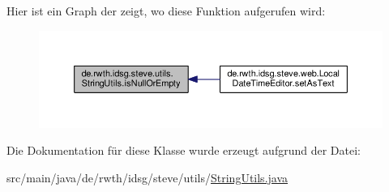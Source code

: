 Hier ist ein Graph der zeigt, wo diese Funktion aufgerufen wird\-:
\nopagebreak
\begin{figure}[H]
\begin{center}
\leavevmode
\includegraphics[width=350pt]{classde_1_1rwth_1_1idsg_1_1steve_1_1utils_1_1_string_utils_a254fa3f1c2751352e69733e35c157c8c_icgraph}
\end{center}
\end{figure}




Die Dokumentation für diese Klasse wurde erzeugt aufgrund der Datei\-:\begin{DoxyCompactItemize}
\item 
src/main/java/de/rwth/idsg/steve/utils/\hyperlink{_string_utils_8java}{String\-Utils.\-java}\end{DoxyCompactItemize}
